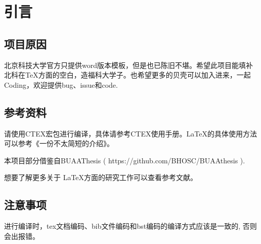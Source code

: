 
\chapter{引言}
\setcounter{page}{1}
\section{项目原因}
北京科技大学官方只提供word版本模板，但是也已陈旧不堪。希望此项目能填补北科在\TeX 方面的空白，造福科大学子。也希望更多的贝壳可以加入进来，一起Coding，欢迎提供bug、issue和code.
\section{参考资料}
请使用CTEX宏包进行编译，具体请参考CTEX使用手册。\LaTeX 的具体使用方法可以参考《一份不太简短的\LaTeXe 介绍》\cite{oetiker2002}。 \par
本项目部分借鉴自BUAAThesis ( https://github.com/BHOSC/BUAAthesis ). \par
想要了解更多关于 \LaTeX 方面的研究工作可以查看参考文献\cite{wenyayuan2012, wangyong2012, niejun2010, majiajia2014, jihongwei2011, duanmaiying2003, chenweide2009}。
\section{注意事项}
进行编译时，tex文档编码、bib文件编码和bst编码的编译方式应该是一致的, 否则会出报错。



